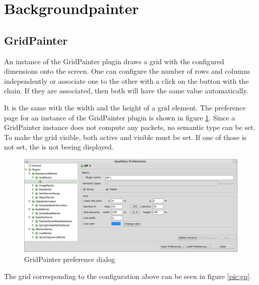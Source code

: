 \newpage
\section{Backgroundpainter}

\subsection{GridPainter}

An instance of the GridPainter plugin draws a grid with the configured dimensions onto the screen.
One can configure the number of rows and columns independently or associate one to the other with a click
on the button with the chain. If they are associated, then both will have the same value automatically.

It is the same with the width and the height of a grid element. The preference page for an instance of the GridPainter
plugin is shown in figure \ref{pic:gp_preferences}. Since a GridPainter instance does not compute any packets, no semantic type
can be set. To make the grid visible, both active and visible must be set. If one of those is not set, the
is not beeing displayed.

\begin{figure}[htb]
  \begin{center}
    \includegraphics[width=13.2cm]{./pics/gridpainter_prefpage}
    \caption{GridPainter preference dialog}
    \label{pic:gp_preferences}
  \end{center}
\end{figure}

The grid corresponding to the configuration above can be seen in figure \ref{pic:gp}.

